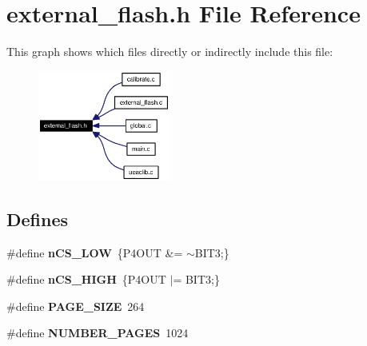 \section{external\_\-flash.h File Reference}
\label{external__flash_8h}


This graph shows which files directly or indirectly include this file:\begin{figure}[H]
\begin{center}
\leavevmode
\includegraphics[width=123pt]{external__flash_8h__dep__incl}
\end{center}
\end{figure}
\subsection*{Defines}
\begin{CompactItemize}
\item 
\#define {\bf n\-CS\_\-LOW}~\{P4OUT \&= $\sim$BIT3;\}
\item 
\#define {\bf n\-CS\_\-HIGH}~\{P4OUT $|$= BIT3;\}
\item 
\#define {\bf PAGE\_\-SIZE}~264
\item 
\#define {\bf NUMBER\_\-PAGES}~1024
\end{CompactItemize}
